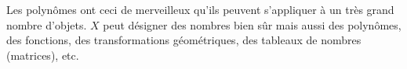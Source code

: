 \begin{Remarque}
    Les polynômes ont ceci de merveilleux qu'ils peuvent s'appliquer à un très grand nombre d'objets. $X$ peut désigner des nombres bien sûr mais aussi des polynômes, des fonctions, des transformations géométriques, des tableaux de nombres (matrices), etc.
\end{Remarque}